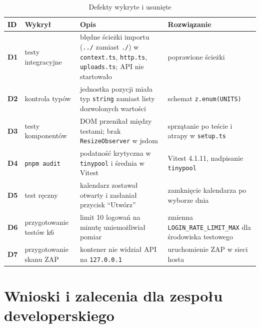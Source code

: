 \documentclass[a4paper,11pt]{article}
\newcommand{\code}[1]{\texttt{\small #1}}
\begin{document}
\begin{table}[H]
\centering\footnotesize
\begin{tabularx}{\textwidth}{@{}>{\sffamily\bfseries\color{accent}}l l L L@{}}
\toprule
\textcolor{black}{ID} & \textsf{\textbf{Wykrył}} & \textsf{\textbf{Opis}} & \textsf{\textbf{Rozwiązanie}}\\
\midrule
D1 & testy integracyjne & błędne ścieżki importu (\code{../} zamiast \code{./}) w \code{context.ts}, \code{http.ts}, \code{uploads.ts}; API nie startowało & poprawione ścieżki\\
D2 & kontrola typów & jednostka pozycji miała typ \code{string} zamiast listy dozwolonych wartości & schemat \code{z.enum(UNITS)}\\
D3 & testy komponentów & DOM przenikał między testami; brak \code{ResizeObserver} w jsdom & sprzątanie po teście i atrapy w \code{setup.ts}\\
D4 & \code{pnpm audit} & podatność krytyczna w \code{tinypool} i średnia w Vitest & Vitest 4.1.11, nadpisanie \code{tinypool}\\
D5 & test ręczny & kalendarz zostawał otwarty i zasłaniał przycisk \enquote{Utwórz} & zamknięcie kalendarza po wyborze dnia\\
D6 & przygotowanie testów k6 & limit 10 logowań na minutę uniemożliwiał pomiar & zmienna \code{LOGIN\_RATE\_LIMIT\_MAX} dla środowiska testowego\\
D7 & przygotowanie skanu ZAP & kontener nie widział API na \code{127.0.0.1} & uruchomienie ZAP w sieci hosta\\
\bottomrule
\end{tabularx}
\caption{Defekty wykryte i usunięte}
\end{table}

\section{Wnioski i zalecenia dla zespołu developerskiego}
\end{document}
